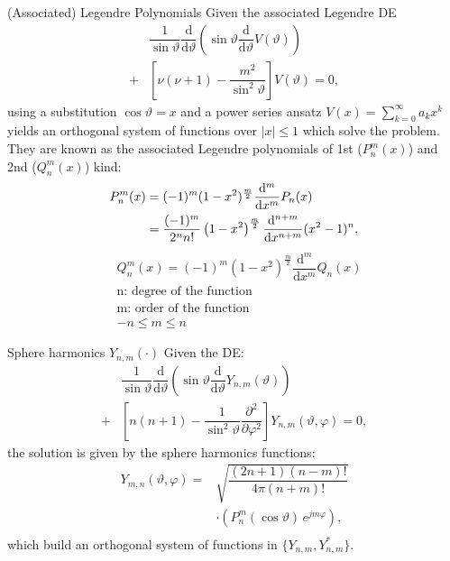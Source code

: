 \begin{info}{(Associated) Legendre Polynomials}
  Given the associated Legendre DE
  \begin{align*}
    &\dfrac{1}{\sin\vartheta}\dfrac{\mathrm{d}}{\mathrm{d}\vartheta}
    \left(\sin\vartheta \dfrac{\mathrm{d}}{\mathrm{d}\vartheta}V(\vartheta)\right)\\
    + &\left[\nu(\nu+1) - \dfrac{m^{2}}{\sin^{2}\vartheta}\right] V(\vartheta) = 0,
  \end{align*}
  using a substitution $\cos\vartheta = x$ and a power series ansatz $V(x) = \sum\limits_{k=0}^{\infty}a_{k}x^{k}$ yields an orthogonal system of functions over $|x|\leq 1$ which solve the problem.\\
  They are known as the associated Legendre polynomials of 1st ($P_{n}^{m}(x)$) and 2nd ($Q_{n}^{m}(x)$) kind:
  \begin{align*}
    P_{n}^{m}(x) &= (-1)^{m}(1-x^{2})^{\frac{m}{2}} \dfrac{\mathrm{d}^{m}}{\mathrm{d}x^{m}} P_{n}(x)\\
    &= \dfrac{(-1)^{m}}{2^{n}n!} \left(1 - x^{2}\right)^{\frac{m}{2}}\dfrac{\mathrm{d}^{n+m}}{\mathrm{d}x^{n+m}}(x^{2}-1)^{n},
  \end{align*}
  \begin{align*}
    &Q_{n}^{m}(x) = (-1)^{m}(1-x^{2})^{\frac{m}{2}} \dfrac{\mathrm{d}^{m}}{\mathrm{d}x^{m}} Q_{n}(x)\\
    &\text{n: degree of the function}\\
    &\text{m: order of the function}\\
    &-n \leq m \leq n
  \end{align*}
\end{info}
\begin{recipe}{Sphere harmonics $Y_{n,m}(\cdot)$}
  Given the DE:
  \begin{align*}
    &\dfrac{1}{\sin\vartheta}\dfrac{\mathrm{d}}{\mathrm{d}\vartheta}
    \left(\sin\vartheta \dfrac{\mathrm{d}}{\mathrm{d}\vartheta}Y_{n,m}(\vartheta)\right)\\
    + &\left[n(n+1) - \dfrac{1}{\sin^{2}\vartheta}\dfrac{\partial^{2}}{\partial\varphi^{2}}\right] Y_{n,m}(\vartheta, \varphi) = 0,
  \end{align*}
  the solution is given by the sphere harmonics functions:
  \begin{align*}
    Y_{m,n}(\vartheta,\varphi) = &\sqrt{\dfrac{(2n+1)(n-m)!}{4\pi(n+m)!}}\\
                           &\cdot (P_{n}^{m}(\cos\vartheta)\,e^{jm\varphi}),\\
  \end{align*}
  which build an orthogonal system of functions in $\{Y_{n,m}, Y_{n,m}^{*}\}$.
\end{recipe}

